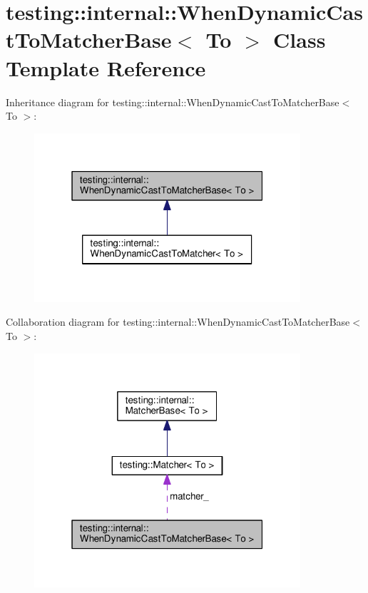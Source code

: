 \hypertarget{classtesting_1_1internal_1_1WhenDynamicCastToMatcherBase}{}\section{testing\+:\+:internal\+:\+:When\+Dynamic\+Cast\+To\+Matcher\+Base$<$ To $>$ Class Template Reference}
\label{classtesting_1_1internal_1_1WhenDynamicCastToMatcherBase}


Inheritance diagram for testing\+:\+:internal\+:\+:When\+Dynamic\+Cast\+To\+Matcher\+Base$<$ To $>$\+:\nopagebreak
\begin{figure}[H]
\begin{center}
\leavevmode
\includegraphics[width=280pt]{classtesting_1_1internal_1_1WhenDynamicCastToMatcherBase__inherit__graph}
\end{center}
\end{figure}


Collaboration diagram for testing\+:\+:internal\+:\+:When\+Dynamic\+Cast\+To\+Matcher\+Base$<$ To $>$\+:\nopagebreak
\begin{figure}[H]
\begin{center}
\leavevmode
\includegraphics[width=280pt]{classtesting_1_1internal_1_1WhenDynamicCastToMatcherBase__coll__graph}
\end{center}
\end{figure}
